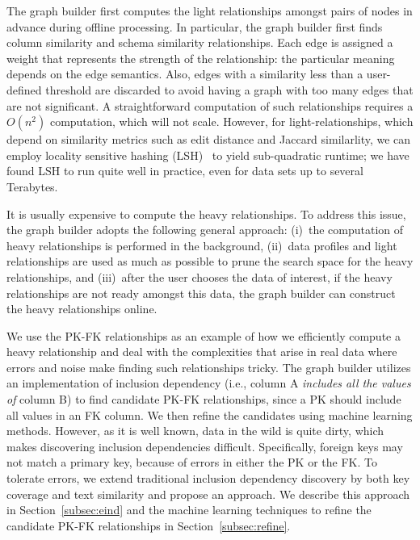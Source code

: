The graph builder first computes the light relationships amongst pairs of
nodes in advance during offline processing. In particular, the graph builder first finds column similarity and
schema similarity relationships.  Each edge is assigned a weight that represents
the strength of the relationship: the particular meaning depends on the edge
semantics. Also, edges with a similarity less than a user-defined threshold are
discarded to avoid having a graph with too many edges that are not significant.
A straightforward computation of such relationships requires a $O(n^2)$
computation, which will not scale. However, for light-relationships, which depend on similarity metrics
such as edit distance and Jaccard similarlity, we can employ locality sensitive hashing
(LSH)~\cite{DBLP:conf/compgeom/DatarIIM04} to yield sub-quadratic runtime; we have found LSH to run quite well in practice, even for data sets up to several Terabytes.

It is usually expensive to compute the heavy relationships. To address this
issue, the graph builder adopts the following general approach: (i)~the
computation of heavy relationships is performed in the background, (ii)~data
profiles and light relationships are used as much as possible to prune the
search space for the heavy relationships, and (iii)~after the user chooses the data of
interest, if the heavy relationships are not ready amongst this data, the graph builder can construct the heavy relationships online.

We use the PK-FK relationships as an example of how
we efficiently compute a heavy relationship and deal with the complexities that arise in real data where errors and noise make finding
such relationships tricky. The graph builder utilizes an
implementation of inclusion dependency (i.e., column A {\it includes all the values of} column B) to find candidate PK-FK relationships, since a PK should include all values in an FK column.  We then 
 refine the candidates using machine learning methods. However,
as it is well known, data in the wild is quite dirty, which makes discovering
inclusion dependencies difficult. Specifically, foreign keys may not match a
primary key, because of errors in either the PK or the FK. To tolerate errors,
we extend traditional inclusion dependency discovery by both key coverage and
text similarity and propose an \emph{\eind} approach. 
We describe this approach in Section~\ref{subsec:eind} and the machine learning
techniques to refine the candidate PK-FK relationships in Section~\ref{subsec:refine}.

